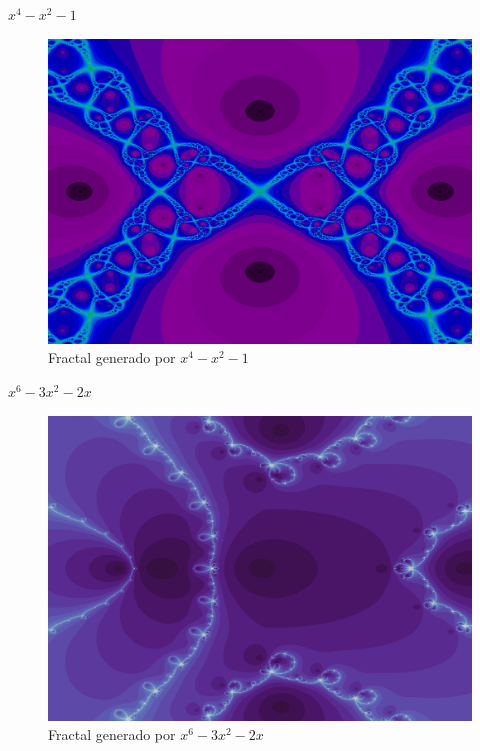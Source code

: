 $x^4-x^2-1$
\begin{figure}[H]
    \centering
    \includegraphics[scale=0.26]{images/ej3.png}
    \caption{Fractal generado por $x^4-x^2-1$}
    \label{fig:ej_3}
\end{figure}

$x^6-3x^2-2x$
\begin{figure}[H]
    \centering
    \includegraphics[scale=0.26]{images/ej4.png}
    \caption{Fractal generado por $x^6-3x^2-2x$}
    \label{fig:ej_4}
\end{figure}

